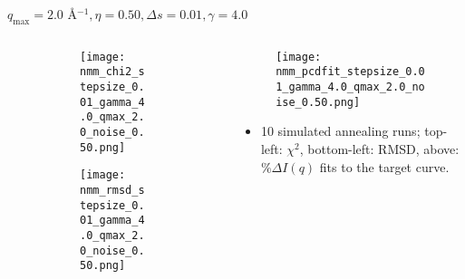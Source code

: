 \documentclass{beamer}
\begin{document}
\begin{frame}{$ q_{\textrm{max}}=2.0 $ \AA $^{-1}, \eta=0.50, \Delta s=0.01, \gamma=4.0$}
	\begin{columns}
		\begin{column}{.5\textwidth}
			\begin{figure}[H]
			\centering
			\begin{subfigure}[b]{\textwidth}
				\centering
				\texttt{[image: nmm\_chi2\_stepsize\_0.01\_gamma\_4.0\_qmax\_2.0\_noise\_0.50.png]}
				\label{fig:}
			\end{subfigure}
			\begin{subfigure}[b]{\textwidth}
				\centering
				\texttt{[image: nmm\_rmsd\_stepsize\_0.01\_gamma\_4.0\_qmax\_2.0\_noise\_0.50.png]}
				\label{fig:}
			\end{subfigure}
			\end{figure}
		\end{column}
		\begin{column}{.5\textwidth}
			\begin{figure}[H]
				\centering
				\texttt{[image: nmm\_pcdfit\_stepsize\_0.01\_gamma\_4.0\_qmax\_2.0\_noise\_0.50.png]}
				\label{fig:}
			\end{figure}
			\begin{itemize}
				\item 10 simulated annealing runs; top-left: $\chi^2$, bottom-left: RMSD, above: $\%\Delta I(q)$ fits to the target curve.
			\end{itemize}
		\end{column}
	\end{columns}
\end{frame}
 
\end{document}
